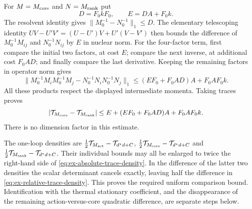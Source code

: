 For $M=M_{\rm core}$ and $N=M_{\rm rank}$ put
\[
 D=F_0kF_0,\qquad E=DA+F_0k.
\]
The resolvent identity gives
$\|M_0^{-1}-N_0^{-1}\|_1\leq D$.
The elementary telescoping identity
$UV-U'V'=(U-U')V+U'(V-V')$ then bounds the difference of
$M_0^{-1}M_{ij}$ and $N_0^{-1}N_{ij}$ by $E$ in nuclear norm.
For the four-factor term, first compare the initial two factors,
at cost $E$; compare the next inverse, at additional cost
$F_0AD$; and finally compare the last derivative. Keeping the
remaining factors in operator norm gives
\[
 \|M_0^{-1}M_iM_0^{-1}M_j
       -N_0^{-1}N_iN_0^{-1}N_j\|_1
       \leq(EF_0+F_0AD)A+F_0AF_0k.
\]
All these products respect the displayed intermediate momenta.
Taking traces proves
\begin{equation}\label{eq:ex-relative-trace-density}
 |\mathcal T_{M_{\rm core}}-\mathcal T_{M_{\rm rank}}|
 \leq E+(EF_0+F_0AD)A+F_0AF_0k.
\end{equation}
There is no dimension factor in this estimate.

The one-loop densities are
$\frac12\mathcal T_{M_{\rm act}}-\mathcal T_{d^*d+C}$,
$\frac12\mathcal T_{M_{\rm core}}-\mathcal T_{d^*d+C}$ and
$\frac12\mathcal T_{M_{\rm rank}}-\mathcal T_{d^*d+C}$.
Their individual bounds may all be enlarged to twice the right-hand
side of \eqref{eq:ex-absolute-trace-density}. In the difference
of the latter two densities the scalar determinant cancels exactly,
leaving half the difference in
\eqref{eq:ex-relative-trace-density}. This proves the required
uniform comparison bound. Identification with the thermal stationary
coefficient, and the disappearance of the remaining action-versus-core
quadratic difference, are separate steps below.
